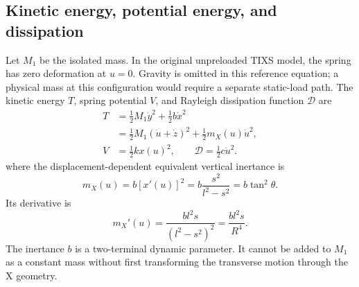 \documentclass[a4paper,12pt]{article}
\numberwithin{equation}{section}
\begin{document}
\subsection{Kinetic energy, potential energy, and dissipation}
Let $M_1$ be the isolated mass. In the original unpreloaded TIXS model, the spring has zero deformation at $u=0$. Gravity is omitted in this reference equation; a physical mass at this configuration would require a separate static-load path. The kinetic energy $T$, spring potential $V$, and Rayleigh dissipation function $\mathcal D$ are
\begin{equation}
\begin{aligned}
T&=\frac12M_1\dot y^2+\frac12b\dot x^2\\
 &=\frac12M_1(\dot u+\dot z)^2
   +\frac12m_X(u)\dot u^2,\\
V&=\frac12kx(u)^2,\qquad
\mathcal D=\frac12c\dot u^2.
\end{aligned}
\label{eq:single-energies}
\end{equation}
where the displacement-dependent equivalent vertical inertance is
\begin{equation}
 m_X(u)=b[x'(u)]^2
 =b\frac{s^2}{l^2-s^2}=b\tan^2\theta.
 \label{eq:single-meff}
\end{equation}
Its derivative is
\begin{equation}
 m_X'(u)=\frac{bl^2s}{(l^2-s^2)^2}=\frac{bl^2s}{R^4}.
 \label{eq:single-mprime}
\end{equation}
The inertance $b$ is a two-terminal dynamic parameter. It cannot be added to $M_1$ as a constant mass without first transforming the transverse motion through the X geometry.
\end{document}

